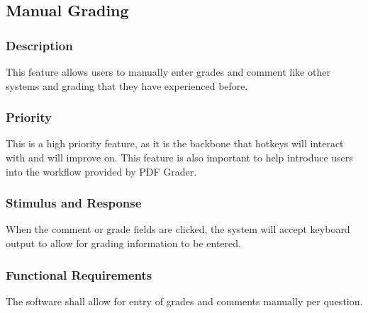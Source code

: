 
\subsection{Manual Grading}
\subsubsection{Description}
This feature allows users to manually enter grades and comment like other systems and grading that they have experienced before.

\subsubsection{Priority}
This is a high priority feature, as it is the backbone that hotkeys will interact with and will improve on. This feature is also important to help introduce users into the workflow provided by PDF Grader.


\subsubsection{Stimulus and Response}
When the comment or grade fields are clicked, the system will accept keyboard output to allow for grading information to be entered.


\subsubsection{Functional Requirements}
The software shall allow for entry of grades and comments manually per question.
